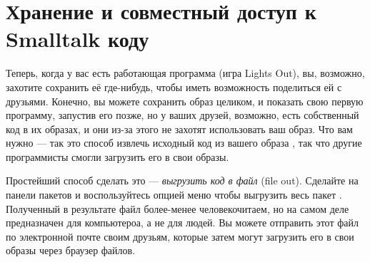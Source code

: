 \documentclass[a4paper,10pt,twoside]{book}
\begin{document}
\section{Хранение и совместный доступ к Smalltalk коду}

Теперь, когда у вас есть работающая программа (игра Lights Out), вы, возможно, захотите сохранить её где-нибудь, чтобы иметь возможность поделиться ей с друзьями. Конечно, вы можете сохранить образ \pharo целиком, и показать свою первую программу, запустив его позже, но у ваших друзей, возможно, есть собственный код в их образах, и они из-за этого не захотят использовать ваш образ.
Что вам нужно --- так это способ извлечь исходный код из вашего образа \pharo, так что другие программисты смогли загрузить его в свои образы.

Простейший способ сделать это --- \emph{выгрузить код в файл} (file out). Сделайте \actclick на панели пакетов и воспользуйтесь опцией меню  чтобы выгрузить весь пакет .
Полученный в результате файл более-менее человекочитаем, но на самом деле предназначен для компьютероа, а не для людей.
Вы можете отправить этот файл по электронной почте своим друзьям, которые затем могут загрузить его в свои образы \pharo через браузер файлов.
\end{document}
